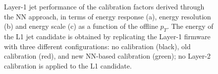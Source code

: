 \begin{figure}
    \centering
    
    \caption{Layer-1 jet performance of the calibration factors derived through the NN approach, in terms of energy response (a), energy resolution (b) and energy scale (c) as a function of the offline $p_T$. The energy of the L1 jet candidate is obtained by replicating the Layer-1 firmware with three different configurations: no calibration (black), old calibration (red), and new NN-based calibration (green); no Layer-2 calibration is applied to the L1 candidate.}
    \label{fig:NN_HCAL_Response}
\end{figure}

